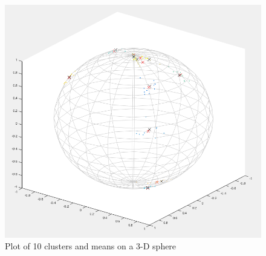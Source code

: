 \begin{figure}
\caption{Plot of 10 clusters and means on a 3-D sphere}


\includegraphics[width=1\textwidth]{img/sphere_points_10_clusters}
\end{figure}
